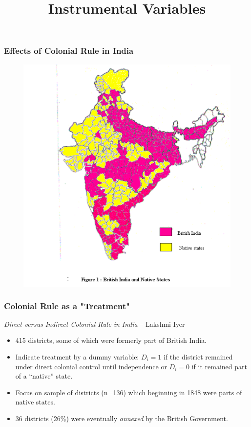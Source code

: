 \documentclass{beamer}
\title{Instrumental Variables}
\begin{document}
\frame{\titlepage}


\begin{frame}
  \frametitle{Effects of Colonial Rule in India}
  \begin{figure}[t]
    \centering
      \includegraphics[scale=.35]{indiamap}
 \end{figure}
\end{frame}

\begin{frame}
  \frametitle{Colonial Rule as a "Treatment"}
{\em Direct versus Indirect Colonial Rule in India} --  Lakshmi Iyer
  \begin{itemize}
  \item 415 districts, some of which were formerly part of British
    India.
  \item Indicate treatment by a dummy variable: 
    $D_i=1$ if the district remained under direct colonial control
    until independence or $D_i=0$ if it remained part of a ``native''
    state.
  \item Focus on sample of districts (n=136) which beginning in 1848 were
    parts of native states.
  \item 36 districts (26\%) were eventually \textit{annexed} by the British
    Government. 
  \end{itemize}
\end{frame}
\end{document}
